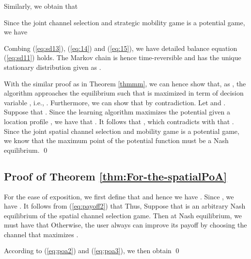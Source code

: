 Similarly, we obtain that

Since the joint channel selection and strategic mobility game is a potential game, we have

Combing (\ref{eq:sd13}), (\ref{eq:14}) and (\ref{eq:15}), we have
detailed balance equation (\ref{eq:sd11}) holds. The Markov chain
is hence time-reversible and has the unique stationary distribution given as .

With the similar proof as in Theorem \ref{thmmm}, we can hence show that, as , the algorithm approaches
the equilibrium such that  is maximized in term of decision variable , i.e., . Furthermore, we can show that  by contradiction. Let  and . Suppose that .
Since the learning algorithm maximizes the potential 
given a location profile , we have that .
It follows that ,
which contradicts with that .
Since the joint spatial channel selection and mobility game is a
potential game, we know that the maximum point  of the potential function must be a Nash equilibrium. \qed

\subsection{Proof of Theorem \ref{thm:For-the-spatialPoA}}\label{proofPoA}
For the ease of exposition, we first define that 
and hence we have .
Since , we have . It follows from (\ref{eq:payoff2})
that
Thus,
Suppose that  is an arbitrary Nash
equilibrium of the spatial channel selection game. Then at Nash equilibrium,
we must have that
Otherwise, the user  always can improve its payoff by choosing
the channel that maximizes .

According to (\ref{eq:poa2}) and (\ref{eq:poa3}), we then obtain
\qed
